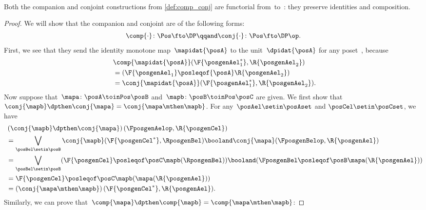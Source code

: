 \begin{lemma}
    \label{lem:comp_conj}
    Both the companion and conjoint constructions from \cref{def:comp_conj} are functorial from~\Pos to~\DP: they preserve identities and composition.
\end{lemma}
\begin{proof}
    We will show that the companion and conjoint are  of the following forms:
    \begin{equation}
        \comp{\cdot}\colon\Pos\fto\DP
        \qqand
        \conj{\cdot}\colon\Pos\fto\DP\op.
    \end{equation}
    First, we see that they send the identity monotone map~$\mapidat{\posA}$ to the unit~$\dpidat{\posA}$ for any poset~\posA, because
    \begin{equation}
        \begin{aligned}
            ~ & \comp{\mapidat{\posA}}(\F{\posgenAel_1^*},\R{\posgenAel_2}) \\
              & = (\F{\posgenAel_1} \posleqof{\posA} \R{\posgenAel_2}) \\
              & =\conj{\mapidat{\posA}}(\F{\posgenAel_1^*},\R{\posgenAel_2}).
        \end{aligned}
    \end{equation}
    Now suppose that~$\mapa\colon  \posA \toinPos \posB $ and~$\mapb\colon \posB \toinPos \posC$ are given.
    We first show that $\conj{\mapb}\dpthen\conj{\mapa}=\conj{\mapa\mthen \mapb}$.
    For any~$\posAel\setin \posAset$ and $\posCel\setin \posCset$, we have
    \begin{equation}
        \begin{aligned}
            ~ & \left(\conj{\mapb}\dpthen \conj{\mapa}\right)(\FposgenAelop,\R{\posgenCel}) \\
              & =\bigvee_{\posBel\setin \posB} \conj{\mapb}(\F{\posgenCel^*},\RposgenBel)\booland\conj{\mapa}(\FposgenBelop,\R{\posgenAel}) \\
              & =\bigvee_{\posBel\setin \posB} (\F{\posgenCel}\posleqof\posC \mapb(\RposgenBel)) \booland (\FposgenBel\posleqof\posB \mapa(\R{\posgenAel})) \\
              & = \F{\posgenCel}\posleqof\posC \mapb(\mapa(\R{\posgenAel})) \\
              & =\left(\conj{\mapa\mthen \mapb}\right)(\F{\posgenCel^*},\R{\posgenAel}).
        \end{aligned}
    \end{equation}
    Similarly, we can prove that~$\comp{\mapa}\dpthen \comp{\mapb}=\comp{\mapa\mthen \mapb}$:

\end{proof}
